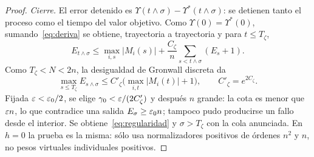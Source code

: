 \begin{proof}
\emph{Cierre.} El error detenido es $\Upsilon(t\wedge\sigma)-\Upsilon^*(t\wedge\sigma)$: se
detienen tanto el proceso como el tiempo del valor objetivo. Como $\Upsilon(0)=\Upsilon^*(0)$,
sumando~\eqref{eq:deriva} se obtiene, trayectoria a trayectoria y para $t\le T_\zeta$,
\[
 E_{t\wedge\sigma}\le\max_{i,s}|M_i(s)|+\frac{C_\zeta}n\sum_{s<t\wedge\sigma}(E_s+1).
\]
Como $T_\zeta<N<2n$, la desigualdad de Gronwall discreta da
\[
 \max_{s\le T_\zeta}E_{s\wedge\sigma}\le C'_\zeta\bigl(\max_{i,t}|M_i(t)|+1\bigr),\qquad
C'_\zeta=e^{2C_\zeta}.
\]
Fijada $\varepsilon<\varepsilon_0/2$, se elige $\gamma_0<\varepsilon/(2C'_\zeta)$ y después $n$ grande: la cota es
menor que $\varepsilon n$, lo que contradice una salida $E_\sigma\ge\varepsilon_0n$; tampoco pudo producirse un
fallo desde el interior. Se obtiene~\eqref{eq:regularidad} y $\sigma>T_\zeta$ con la cola
anunciada. En $h=0$ la prueba es la misma: sólo usa normalizadores positivos de órdenes $n^2$ y
$n$, no pesos virtuales individuales positivos.
\end{proof}
